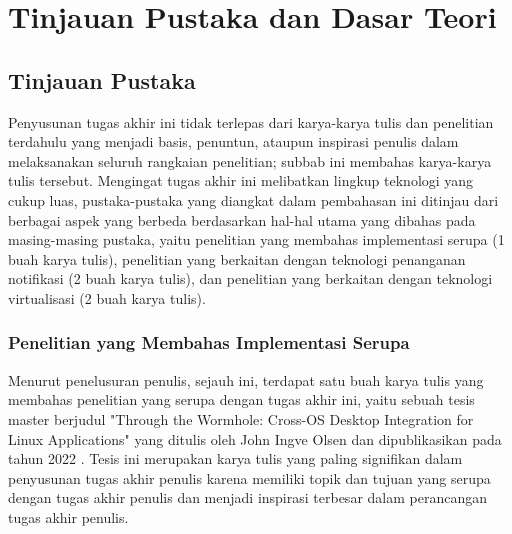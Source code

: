 \chapter{Tinjauan Pustaka dan Dasar Teori}

\section{Tinjauan Pustaka}

Penyusunan tugas akhir ini tidak terlepas dari karya-karya tulis dan penelitian terdahulu yang menjadi basis, penuntun, ataupun inspirasi penulis dalam melaksanakan seluruh rangkaian penelitian; subbab ini membahas karya-karya tulis tersebut. Mengingat tugas akhir ini melibatkan lingkup teknologi yang cukup luas, pustaka-pustaka yang diangkat dalam pembahasan ini ditinjau dari berbagai aspek yang berbeda berdasarkan hal-hal utama yang dibahas pada masing-masing pustaka, yaitu penelitian yang membahas implementasi serupa (1 buah karya tulis), penelitian yang berkaitan dengan teknologi penanganan notifikasi (2 buah karya tulis), dan penelitian yang berkaitan dengan teknologi virtualisasi (2 buah karya tulis).

\subsection{Penelitian yang Membahas Implementasi Serupa}

Menurut penelusuran penulis, sejauh ini, terdapat satu buah karya tulis yang membahas penelitian yang serupa dengan tugas akhir ini, yaitu sebuah tesis master berjudul "Through the Wormhole: Cross-OS Desktop Integration for Linux Applications" yang ditulis oleh John Ingve Olsen dan dipublikasikan pada tahun 2022 \cite{olsen-2022-through-the-wormhole}. Tesis ini merupakan karya tulis yang paling signifikan dalam penyusunan tugas akhir penulis karena memiliki topik dan tujuan yang serupa dengan tugas akhir penulis dan menjadi inspirasi terbesar dalam perancangan tugas akhir penulis.

